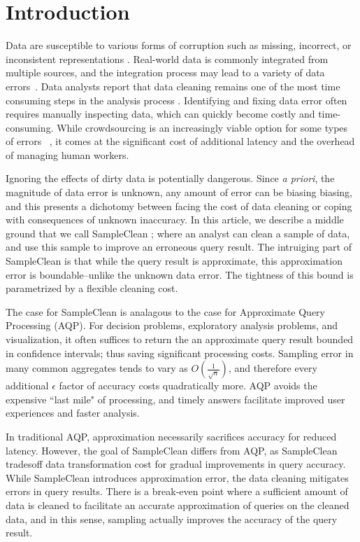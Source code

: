 \section{Introduction}
Data are susceptible to various forms of corruption such as missing,
incorrect, or inconsistent representations \cite{Gartner}.
Real-world data is commonly integrated from multiple sources, and the integration process may lead to a variety of data errors~\cite{DBLP:journals/pvldb/DongS13}. 
Data analysts report that data cleaning remains one of the most time
consuming steps in the analysis process \cite{nytimes}.
Identifying and fixing data error often requires manually inspecting data, which can quickly become costly and time-consuming. 
While crowdsourcing is an increasingly viable option for some types of errors ~\cite{DBLP:conf/sigmod/JefferyFH08,DBLP:journals/pvldb/FanLMTY10,DBLP:journals/pvldb/YakoutENOI11, gokhale2014corleone, park2014crowdfill, sampleclean,chu2015katara}, it comes at the significant cost of additional latency and the overhead of managing human workers. 

Ignoring the effects of dirty data is potentially dangerous.
Since \emph{a priori}, the magnitude of data error is unknown, any amount of error can be biasing biasing, and this presents a dichotomy between facing the cost of data cleaning
or coping with consequences of unknown inaccuracy.
In this article, we describe a middle ground that we call SampleClean \cite{wang1999sample}; where an analyst can clean a sample of data, and use this sample to improve an erroneous query result.
The intruiging part of SampleClean is that while the query result is approximate, this approximation error is boundable--unlike the unknown data error.
The tightness of this bound is parametrized by a flexible cleaning cost.

The case for SampleClean is analagous to the case for Approximate Query Processing \cite{DBLP:conf/icde/OlkenR92, olken1993random, garofalakis2001approximate, AgarwalMPMMS13} (AQP).
For decision problems, exploratory analysis problems, and visualization, it often suffices to return the an approximate query result bounded in confidence intervals; thus saving significant processing costs.
Sampling error in many common aggregates tends to vary as $O(\frac{1}{\sqrt{n}})$, and therefore every additional $\epsilon$ factor of accuracy costs quadratically more.
AQP avoids the expensive ``last mile" of processing, and timely answers facilitate improved user experiences and faster analysis.

In traditional AQP, approximation necessarily sacrifices accuracy for reduced latency. 
However, the goal of SampleClean differs from AQP, as SampleClean tradesoff data transformation cost for gradual improvements in query accuracy.
While SampleClean introduces approximation error, the data cleaning mitigates errors in query results.
There is a break-even point where a sufficient amount of data is cleaned to facilitate an accurate approximation of queries on the cleaned data, and in this sense, sampling actually improves the accuracy of the query result.

